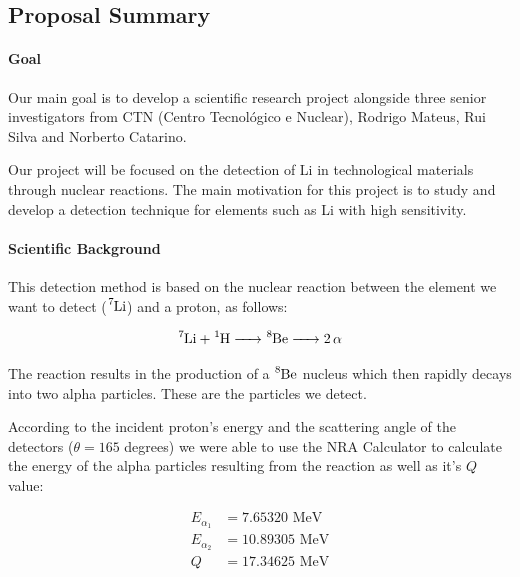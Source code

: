 \documentclass{article}
\begin{document}
\begin{multicols}{2}


\section{Proposal Summary}

\paragraph{Goal}

Our main goal is to develop a scientific research project alongside three senior investigators from CTN
(Centro Tecnológico e Nuclear), Rodrigo Mateus, Rui Silva and Norberto Catarino. 

Our project will be focused on the detection of Li in technological materials through nuclear reactions.
The main motivation for this project is to study and develop a detection technique for elements such as Li with
high sensitivity.

\paragraph{Scientific Background}

This detection method is based on the nuclear reaction between the element we want to detect ($\ce{^7Li}$) and a proton, as follows:

\begin{equation}
  \ce{^7Li + ^1H -> ^8Be -> 2\alpha}
\label{eq:reaction}
\end{equation}

The reaction results in the production of a $\ce{^8Be}$ nucleus which then rapidly decays into two alpha particles. These are the particles we detect.

According to the incident proton's energy and the scattering angle of the detectors ($\theta = 165 $ degrees) we were able to use the NRA Calculator \cite{NRAEnergyCalc} to calculate the energy of the alpha particles resulting from the reaction as well as it's $Q$ value:

\begin{equation}
\begin{split}
  E_{\alpha_1} &= 7.65320 \text{ MeV} \\
  E_{\alpha_2} &= 10.89305 \text{ MeV} \\
  Q &= 17.34625 \text{ MeV}
\end{split}
\label{eq:energies}
\end{equation}


\end{multicols}
\end{document}
